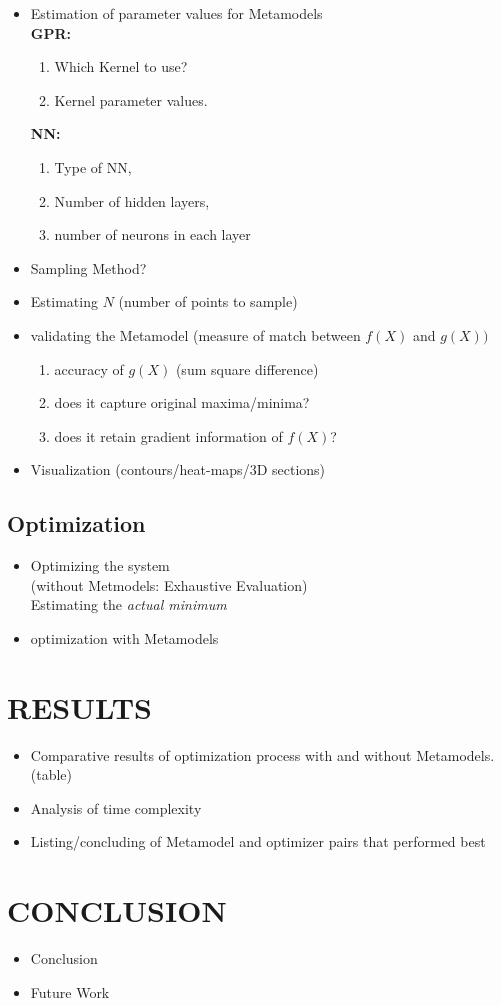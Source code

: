 \begin{itemize}
    \item Estimation of parameter values for Metamodels\\
    \textbf{GPR:}
    \begin{enumerate}
        \item Which Kernel to use?
        \item Kernel parameter values.
    \end{enumerate}
     \textbf{NN:} 
     \begin{enumerate}
         \item Type of NN,
         \item Number of hidden layers,
         \item number of neurons in each layer
     \end{enumerate}
    \item Sampling Method?
    \item Estimating $N$ (number of points to sample)
    \item validating the Metamodel (measure of match between $f(X)$ and $g(X))$
    \begin{enumerate}
        \item accuracy of $g(X)$ (sum square difference)
        \item does it capture original maxima/minima?
        \item does it retain gradient information of $f(X)$?
    \end{enumerate}
    \item Visualization (contours/heat-maps/3D sections)
\end{itemize}

\subsection{Optimization}
\begin{itemize}
    \item Optimizing the system \\(without Metmodels: Exhaustive Evaluation)\\ Estimating the \textit{actual minimum} 
    \item optimization with Metamodels
\end{itemize}
\section{\uppercase{Results}}
\begin{itemize}
    \item Comparative results of optimization process with and without Metamodels. (table)
    \item Analysis of time complexity
    \item Listing/concluding of Metamodel and optimizer pairs that performed best
\end{itemize}
\section{\uppercase{Conclusion}}
\begin{itemize}
    \item Conclusion
    \item Future Work
\end{itemize}